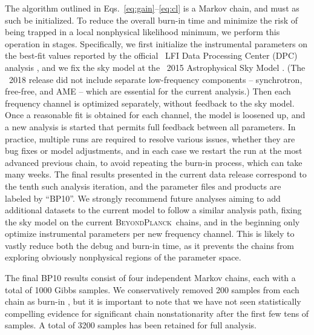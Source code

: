 \documentclass[twocolumn]{aa}
\newcommand{\BP}{\textsc{BeyondPlanck}}
\begin{document}
The algorithm outlined in Eqs.~\eqref{eq:gain}--\eqref{eq:cl} is a
Markov chain, and must as such be initialized. To reduce the overall
burn-in time and minimize the risk of being trapped in a local
nonphysical likelihood minimum, we perform this operation in
stages. Specifically, we first initialize the instrumental parameters
on the best-fit values reported by the official \Planck\ LFI Data Processing Center (DPC)
analysis \citep{planck2016-l02}, and we fix the sky model at the
\Planck\ 2015 Astrophysical Sky Model \citep{planck2014-a12}. (The
\Planck\ 2018 release did not include separate low-frequency
components -- synchrotron, free-free, and AME -- which are essential
for the current analysis.) Then each frequency channel is optimized
separately, without feedback to the sky model. Once a reasonable fit
is obtained for each channel, the model is loosened up, and a new
analysis is started that permits full feedback between all
parameters. In practice, multiple runs are required to resolve various
issues, whether they are bug fixes or model adjustments, and in each
case we restart the run at the most advanced previous chain, to avoid
repeating the burn-in process, which can take many weeks. The final
results presented in the current data release correspond to the tenth
such analysis iteration, and the parameter files and products
\citep{bp03} are labeled by ``BP10''. We strongly recommend
future analyses aiming to add additional datasets to the current model
to follow a similar analysis path, fixing the sky model on the current
\BP\ chains, and in the beginning only optimize instrumental
parameters per new frequency channel. This is likely to vastly reduce
both the debug and burn-in time, as it prevents the chains from
exploring obviously nonphysical regions of the parameter space.

The final BP10 results consist of four independent Markov chains, each
with a total of 1000 Gibbs samples. We conservatively removed 200
samples from each chain as burn-in \citep{bp12}, but it is important 
to note that we have
not seen statistically compelling evidence for significant chain
nonstationarity after the first few tens of samples. A total of 3200
samples has been retained for full analysis.
\end{document}
